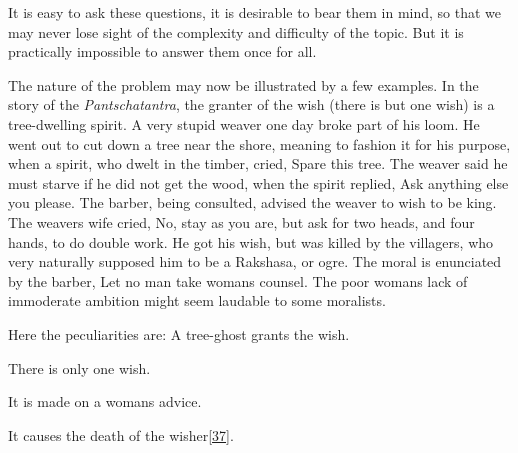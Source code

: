 \documentclass[14pt,a4paper]{memoir}
\begin{document}
It is easy to ask these questions, it is desirable to bear them in mind,
so that we may never lose sight of the complexity and difficulty of the
topic. But it is practically impossible to answer them once for all.

The nature of the problem may now be illustrated by a few examples. In
the story of the \emph{Pantschatantra}, the granter of the wish (there
is but one wish) is a tree-dwelling spirit. A very stupid weaver one day
broke part of his loom. He went out to cut down a tree near the shore,
meaning to fashion it for his purpose, when a spirit, who dwelt in the
timber, cried, \textquotesingle Spare this tree.\textquotesingle{} The
weaver said he must starve if he did not get the wood, when the spirit
replied, \textquotesingle Ask anything else you
please.\textquotesingle{} The barber, being consulted, advised the
weaver to wish to be king. The weaver\textquotesingle s wife cried,
\textquotesingle No, stay as you are, but ask for two heads, and four
hands, to do double work.\textquotesingle{} He got his wish, but was
killed by the villagers, who very naturally supposed him to be a
Rakshasa, or ogre. The moral is enunciated by the barber,
\textquotesingle Let no man take woman\textquotesingle s
counsel.\textquotesingle{} The poor woman\textquotesingle s lack of
immoderate ambition might seem laudable to some moralists.

Here the peculiarities are: A tree-ghost grants the wish.

There is only one wish.

It is made on a woman\textquotesingle s advice.

It causes the death of the
wisher\protect\hypertarget{4533318093929944247_33931-h-0.htm.xhtmlux5cux23FNanchor_37}{}{}\protect\hyperlink{4533318093929944247_33931-h-0.htm.xhtmlux5cux23Footnote_37}{{[}37{]}}.
\end{document}
